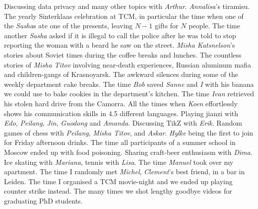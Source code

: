 Discussing data privacy and many other topics with \emph{Arthur}. \emph{Annalisa}'s tiramisu. The yearly Sinterklaas celebration at TCM, in particular the time when one of the \emph{Sasha}s ate one of the presents, leaving $N-1$ gifts for $N$ people. The time another \emph{Sasha} asked if it is illegal to call the police after he was told to stop reporting the woman with a beard he saw on the street. \emph{Misha Katsnelson}'s stories about Soviet times during the coffee breaks and lunches. The countless stories of \emph{Misha Titov} involving near-death experiences, Russian aluminum mafia and children-gangs of Krasnoyarsk. The awkward silences during some of the weekly department cake breaks. The time \emph{Bob} saved \emph{Sanne} and \emph{I} with his banana we could use to bake cookies in the department's kitchen. 
The time \emph{Ivan} retrieved his stolen hard drive from the Camorra. All the times when \emph{Koen} effortlessly shows his communication skills in 4.5 different languages. Playing jianzi with \emph{Edo}, \emph{Peilang}, \emph{Jin}, \emph{Guodong} and \emph{Amanda}. Discussing TikZ with \emph{Erik}. Random games of chess with \emph{Peilang}, \emph{Misha Titov}, and \emph{Askar}. \emph{Hylke} being the first to join for Friday afternoon drinks. The time all participants of a summer school in Moscow ended up with food poisoning. Sharing craft-beer enthusiasm with \emph{Dima}. Ice skating with \emph{Mariana}, tennis with \emph{Lisa}. The time \emph{Manuel} took over my apartment. The time I randomly met \emph{Michel}, \emph{Clement}'s best friend, in a bar in Leiden.  
The time I organised a TCM movie-night and we ended up playing counter strike instead. The many times we shot lengthy goodbye videos for graduating PhD students. 

